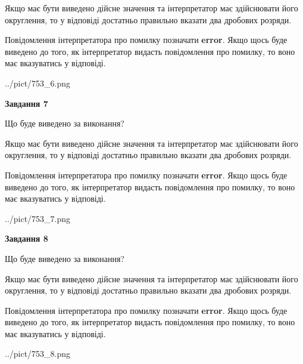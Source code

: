 \documentclass[12pt, ukrainian]{article}
\begin{document}
{\begin {Large}
Якщо має бути виведено дійсне значення та інтерпретатор має здійснювати його округлення, 
то у відповіді достатньо правильно вказати два дробових розряди.

Повідомлення інтерпретатора про помилку позначати \textbf{error}.
Якщо щось буде виведено до того, як інтерпретатор видасть повідомлення про помилку, 
то воно має вказуватись у відповіді. \par

\begin{center}
	{../pict/753_6.png}
\end{center}
\newpage

{\begin {center}\textbf{Завдання 7}\end {center}}\par
Що буде виведено за виконання? \par

Якщо має бути виведено дійсне значення та інтерпретатор має здійснювати його округлення, 
то у відповіді достатньо правильно вказати два дробових розряди.

Повідомлення інтерпретатора про помилку позначати \textbf{error}.
Якщо щось буде виведено до того, як інтерпретатор видасть повідомлення про помилку, 
то воно має вказуватись у відповіді. \par

\begin{center}
	{../pict/753_7.png}
\end{center}
\newpage

{\begin {center}\textbf{Завдання 8}\end {center}}\par
Що буде виведено за виконання? \par

Якщо має бути виведено дійсне значення та інтерпретатор має здійснювати його округлення, 
то у відповіді достатньо правильно вказати два дробових розряди.

Повідомлення інтерпретатора про помилку позначати \textbf{error}.
Якщо щось буде виведено до того, як інтерпретатор видасть повідомлення про помилку, 
то воно має вказуватись у відповіді. \par

\begin{center}
	{../pict/753_8.png}
\end{center}
\newpage


\end{Large}}
\end{document}
